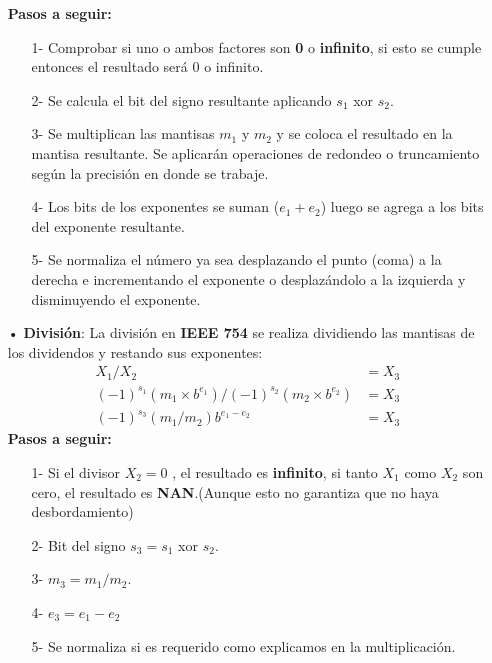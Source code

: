 \documentclass[a4paper,10pt,twocolumn]{article}
\begin{document}
\begin{itemize}
		\textbf{Pasos a seguir:}
		\begin{itemize}
			\item[1-] Comprobar si uno o ambos factores son \textbf{0} o \textbf{infinito}, si esto se cumple entonces  el resultado será 0 o infinito. \\
			\item[2-] Se calcula el bit del signo resultante aplicando $s_1$ xor $s_2$. \\
			\item[3-] Se multiplican las mantisas $m_1$ y $m_2$ y se coloca el resultado en la mantisa resultante. Se aplicarán operaciones de redondeo o truncamiento según la precisión en donde se trabaje. \\
			\item[4-] Los bits de los exponentes se suman ($e_1 + e_2$) luego se agrega a los bits del exponente resultante. \\
			\item[5-] Se normaliza el número ya sea desplazando el punto (coma) a la derecha e incrementando el exponente o desplazándolo a la izquierda y disminuyendo el exponente. \\
		\end{itemize}
		\item[•]\textbf{División}: La división en \textbf{IEEE 754} se realiza dividiendo las mantisas de los dividendos y restando sus exponentes:\\
		\begin{align}
			X_1 / X_2 &= X_3\\
			(-1)^{s_1} ( m_1 \times b^{e_1}) / (-1)^{s_2} ( m_2 \times b^{e_2}) &= X_3  \\
			(-1)^{s_3} (m_1 / m_2) b^{e_1-e_2} &= X_3
		\end{align} 
		\textbf{Pasos a seguir:}
		\begin{itemize}
			\item[1-] Si el divisor $X_2 = 0$ ,  el resultado es \textbf{infinito}, si tanto $X_1$ como $X_2$ son cero, el resultado es \textbf{NAN}.(Aunque esto no garantiza que no haya desbordamiento) \\
			\item[2-] Bit del signo $s_3 = s_1$ xor $s_2$. \\
			\item[3-] $m_3 = m_1 / m_2$. \\
			\item[4-] $e_3 = e_1 - e_2$
			\item[5-] Se normaliza si es requerido como explicamos en la multiplicación.\\
		\end{itemize}
   


\end{itemize}
\end{document}
